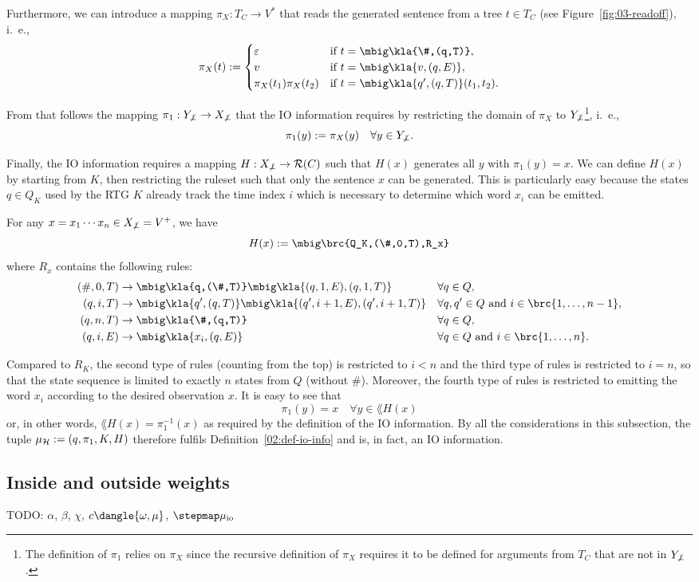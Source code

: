 Furthermore, we can introduce a mapping $\pi_X: T_C \to V^*$ that reads the
generated sentence from a tree $t\in T_C$ (see Figure~\ref{fig:03-readoff}),
i.~e.,
\[
 \pi_X(t) := \begin{cases}
  \eps & \text{if } t = \mbig\kla{\#,(q,T)}, \\
  v    & \text{if } t = \mbig\kla{v,(q,E)}, \\
  \pi_X(t_1)\pi_X(t_2) & \text{if } t = \mbig\kla{q',(q,T)}(t_1,t_2).
 \end{cases}
\]

From that follows the mapping $\pi_1: Y_{\not\bot} \to X_{\not\bot}$ that the
IO information requires by restricting the domain of $\pi_X$ to
$Y_{\not\bot}$\footnote{The definition of $\pi_1$ relies on $\pi_X$ since the
recursive definition of $\pi_X$ requires it to be defined for arguments from
$T_C$ that are not in $Y_{\not\bot}$.}, i.~e.,
\[
 \pi_1(y) := \pi_X(y) \quad\forall y\in Y_{\not\bot}.
\]

Finally, the IO information requires a mapping $H: X_{\not\bot}\to\mathcal R(C)$ such
that $H(x)$ generates all $y$ with $\pi_1(y)=x$. We can define $H(x)$ by
starting from $K$, then restricting the ruleset such that only the sentence $x$
can be generated. This is particularly easy because the states $q\in Q_K$ used
by the RTG $K$ already track the time index $i$ which is necessary to determine
which word $x_i$ can be emitted.

For any $x=x_1\cdots x_n\in X_{\not\bot} = V^+$, we have
\[
 H(x) := \mbig\brc{Q_K,(\#,0,T),R_x}
\]
where $R_x$ contains the following rules:
\begin{align*}
 (\#,0,T) &\to \mbig\kla{q,(\#,T)}\mbig\kla{(q,1,E),(q,1,T)} &&\forall q\in Q, \\
 (q,i,T) &\to \mbig\kla{q',(q,T)}\mbig\kla{(q',i+1,E),(q',i+1,T)} &&\forall q,q'\in Q \text{ and } i\in\brc{1,\ldots,n-1}, \\
 (q,n,T) &\to \mbig\kla{\#,(q,T)} &&\forall q\in Q, \\
 (q,i,E) &\to \mbig\kla{x_i,(q,E)} &&\forall q\in Q\text{ and } i\in\brc{1,\ldots,n}.
\end{align*}

Compared to $R_K$, the second type of rules (counting from the top) is
restricted to $i < n$ and the third type of rules is restricted to $i = n$, so
that the state sequence is limited to exactly $n$ states from $Q$ (without
$\#$). Moreover, the fourth type of rules is restricted to emitting the word
$x_i$ according to the desired observation $x$. It is easy to see that
\[
 \pi_1(y) = x \quad\forall y\in\lang{H(x)}
\]
or, in other words, $\lang{H(x)} = \pi_1^{-1}(x)$ as required by the definition
of the IO information. By all the considerations in this subsection, the tuple
$\mu_\mathcal H := (q,\pi_1,K,H)$ therefore fulfils Definition~\ref{02:def-io-info} and
is, in fact, an IO information.

\subsection{Inside and outside weights}

{\color{red}TODO: $\alpha$, $\beta$, $\chi$, $c\dangle{\omega,\mu}$, $\stepmap\mu_\mathrm{io}$}

